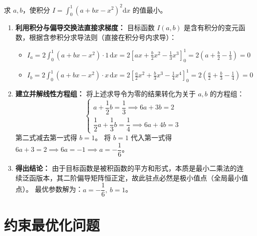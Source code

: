 \documentclass[lang=cn,11pt]{elegantbook}
\begin{document}
\begin{exercise}[泛函积分求极值]
求 $a,b$，使积分 $I=\int_0^1 (a+bx-x^2)^2\mathrm{d}x$ 的值最小。
\end{exercise}
\begin{solution}
\begin{enumerate}
  \item \textbf{利用积分与偏导交换法直接求梯度：}
  目标函数 $I(a,b)$ 是含有积分的变元函数，根据含参积分求导法则（直接在积分号内求导）：
  \begin{itemize}
    \item $I_a = 2 \int_0^1 (a+bx-x^2) \cdot 1 \, \mathrm{d}x = 2 \left[ ax + \frac{b}{2}x^2 - \frac{1}{3}x^3 \right]_0^1 = 2\left( a + \frac{b}{2} - \frac{1}{3} \right) = 0$
    \item $I_b = 2 \int_0^1 (a+bx-x^2) \cdot x \, \mathrm{d}x = 2 \left[ \frac{a}{2}x^2 + \frac{b}{3}x^3 - \frac{1}{4}x^4 \right]_0^1 = 2\left( \frac{a}{2} + \frac{b}{3} - \frac{1}{4} \right) = 0$
  \end{itemize}

  \item \textbf{建立并解线性方程组：}
  将上述求导令为零的结果转化为关于 $a,b$ 的方程组：
  \[
  \begin{cases}
  a + \dfrac{1}{2}b = \dfrac{1}{3} \implies 6a + 3b = 2 \\
  \dfrac{1}{2}a + \dfrac{1}{3}b = \dfrac{1}{4} \implies 6a + 4b = 3
  \end{cases}
  \]
  第二式减去第一式得 $b = 1$。
  将 $b=1$ 代入第一式得 $6a + 3 = 2 \implies 6a = -1 \implies a = -\dfrac{1}{6}$。

  \item \textbf{得出结论：}
  由于目标函数是被积函数的平方和形式，本质是最小二乘法的连续泛函版本，其二阶偏导矩阵恒正定，故此驻点必然是极小值点（全局最小值点）。
  最优参数解为：$\boxed{a = -\dfrac{1}{6},\ b = 1}$。
\end{enumerate}
\end{solution}





\section{约束最优化问题}
\end{document}
